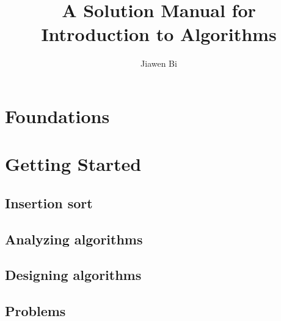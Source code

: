 \documentclass[Unicode]{article}
\title{A Solution Manual for Introduction to Algorithms}
\author{Jiawen Bi}
\begin{document}
\maketitle
\tableofcontents

\section{Foundations}
\section{Getting Started}
\subsection{Insertion sort}

\subsection{Analyzing algorithms}

\subsection{Designing algorithms}


\subsection{Problems}
\end{document}
